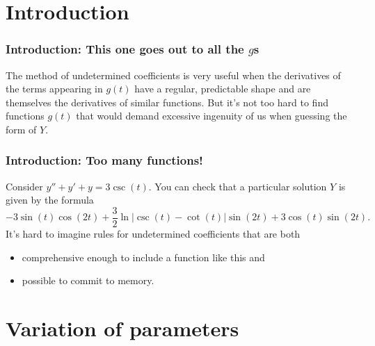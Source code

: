 \def\encoding{UTF-8}

\def\mytitle{Variation of parameters}
\def\affiliation{The College of Idaho}
\def\myauthor{Math 352 Differential Equations}
\def\mydate{8 April 2013}
\def\latexmode{beamer}

\def\htmlheaderlevel{2}
\section{Introduction}
\label{introduction}

\begin{frame}

\frametitle{Introduction: This one goes out to all the $ g $s}
\label{introduction:thisonegoesouttoallthegs}

The method of undetermined coefficients is very useful when the derivatives of the terms appearing in $ g(t) $ have a regular, predictable shape and are themselves the derivatives of similar functions. But it's not too hard to find functions $ g(t) $ that would demand excessive ingenuity of us when guessing the form of $ Y $.

\end{frame}

\begin{frame}

\frametitle{Introduction: Too many functions!}
\label{introduction:toomanyfunctions}

Consider $ y'' + y' + y = 3 \csc{(t)} $. You can check that a particular solution $ Y $ is given by the formula
 \pause 
\[
    -3 \sin{(t)} \cos{(2t)} + \frac{3}{2} \ln |\csc{(t)} - \cot{(t)}| \sin{(2t)} + 3 \cos{(t)} \sin{(2t)}.
\]
 \pause 
It's hard to imagine rules for undetermined coefficients that are both

\begin{itemize}
\item comprehensive enough to include a function like this and

\item possible to commit to memory.

\end{itemize}

\end{frame}

\section{Variation of parameters}
\label{variationofparameters}

